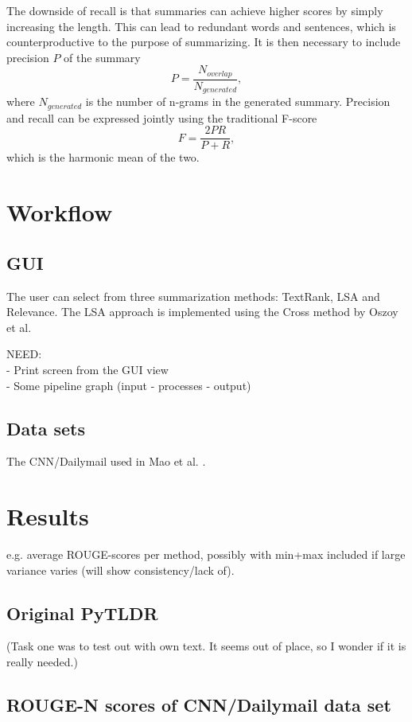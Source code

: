 \documentclass[conference]{IEEEtran}
\begin{document}
The downside of recall is that summaries can achieve higher scores by simply increasing the length. This can lead to redundant words and sentences, which is counterproductive to the purpose of summarizing. It is then necessary to include precision $P$ of the summary
\begin{equation}
P = \frac{N_{overlap}}{N_{generated}},
\end{equation}
where $N_{generated}$ is the number of n-grams in the generated summary. Precision and recall can be expressed jointly using the traditional F-score
\begin{equation}
F = \frac{2PR}{P + R},
\end{equation}
which is the harmonic mean of the two.

\section{Workflow}\label{implementation} %
\subsection{GUI}
The user can select from three summarization methods: TextRank, LSA and Relevance. The LSA approach is implemented using the Cross method by Oszoy et al.

NEED: \\
- Print screen from the GUI view \\
- Some pipeline graph (input - processes - output) \\

\subsection{Data sets}\label{data}
The CNN/Dailymail used in Mao et al. \cite{mao2019}.

\section{Results}\label{results}
e.g. average ROUGE-scores per method, possibly with min+max included if large variance varies (will show consistency/lack of).
\subsection{Original PyTLDR}
(Task one was to test out with own text. It seems out of place, so I wonder if it is really needed.)
\subsection{ROUGE-N scores of CNN/Dailymail data set}
\end{document}
